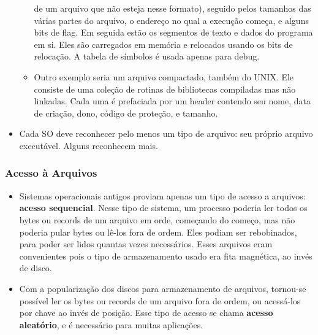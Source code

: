 \documentclass[10pt]{article}
\begin{document}
\begin{itemize}
\begin{itemize}
        de um arquivo que não esteja nesse formato), seguido pelos tamanhos das várias partes do arquivo, o
        endereço no qual a execução começa, e alguns bits de flag. Em seguida estão os segmentos de texto e dados
        do programa em si. Eles são carregados em memória e relocados usando os bits de relocação. A tabela de símbolos
        é usada apenas para debug.
        \item Outro exemplo seria um arquivo compactado, também do UNIX. Ele consiste de uma coleção de rotinas de 
        bibliotecas compiladas mas não linkadas. Cada uma é prefaciada por um header contendo seu nome, data de criação,
        dono, código de proteção, e tamanho.
    \end{itemize}
    \item Cada SO deve reconhecer pelo menos um tipo de arquivo: seu próprio arquivo executável. Alguns reconhecem mais.
\end{itemize}

\subsubsection{Acesso à Arquivos}
\begin{itemize}
    \item Sistemas operacionais antigos proviam apenas um tipo de acesso a arquivos: \textbf{acesso sequencial}. Nesse tipo
    de sistema, um processo poderia ler todos os bytes ou records de um arquivo em orde, começando do começo, mas não poderia
    pular bytes ou lê-los fora de ordem. Eles podiam ser rebobinados, para poder ser lidos quantas vezes necessários. Esses
    arquivos eram convenientes pois o tipo de armazenamento usado era fita magnética, ao invés de disco.
    \item Com a popularização dos discos para armazenamento de arquivos, tornou-se possível ler os bytes ou records de um 
    arquivo fora de ordem, ou acessá-los por chave ao invés de posição. Esse tipo de acesso se chama \textbf{acesso aleatório},
    e é necessário para muitas aplicações.
\end{itemize}
\end{document}
